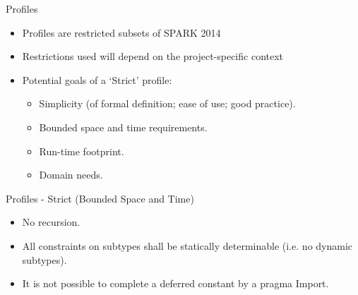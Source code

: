 \documentclass{beamer}
\begin{document}
\begin{frame}{Profiles}

  \begin{itemize}

  \item Profiles are restricted subsets of SPARK 2014

  \item Restrictions used will depend on the project-specific context

  \item Potential goals of a `Strict' profile:

    \begin{itemize}

    \item Simplicity (of formal definition; ease of use; good practice).

    \item Bounded space and time requirements.

    \item Run-time footprint.

    \item Domain needs.

    \end{itemize}

  \end{itemize}

\end{frame}

\begin{frame}{Profiles - Strict (Bounded Space and Time)}

  \begin{itemize}

  \item No recursion.

  \item All constraints on subtypes shall be statically determinable
        (i.e. no dynamic subtypes).

  \item It is not possible to complete a deferred constant by a pragma Import.

  \end{itemize}
\end{frame}
\end{document}
